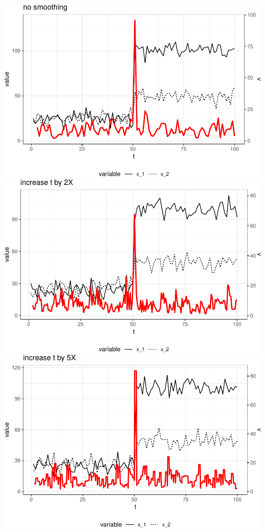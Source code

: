 \documentclass[12pt,twoside,openany]{reedthesis}
\begin{document}
\includegraphics{_myDissertation_files/figure-latex/smoothV-1.pdf}
\includegraphics{_myDissertation_files/figure-latex/smoothV-2.pdf}
\includegraphics{_myDissertation_files/figure-latex/smoothV-3.pdf}
\end{document}
